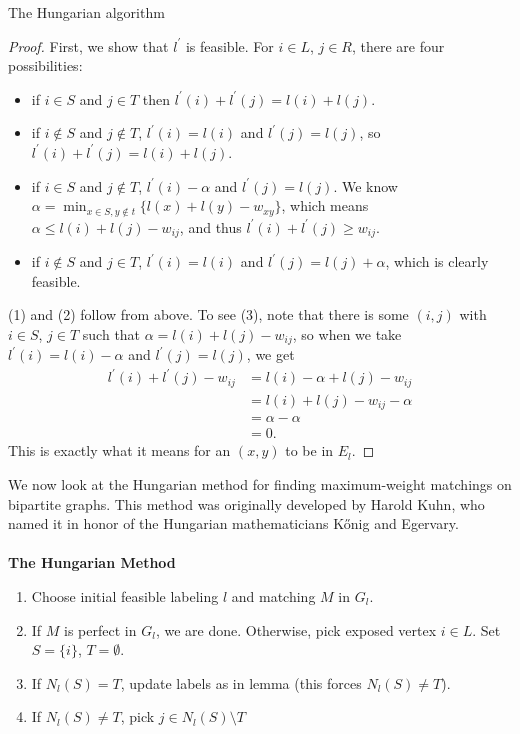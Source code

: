 \documentclass[11pt]{article}
\renewcommand{\'}{^{'}}
\begin{document}
\begin{section}{The Hungarian algorithm}
	\begin{proof}
		First, we show that $l\'$ is feasible. For $i\in L$, $j\in R$, there are four 
		possibilities:
		\begin{itemize}
			\item if $i\in S$ and $j\in T$ then $l\' (i) + l\' (j) = l(i) + l(j)$.
			\item if $i\notin S$ and $j\notin T$, $l\' (i) = l(i)$ and $l\' (j) = l(j)$, 
				so $l\' (i) + l\' (j) = l(i) + l(j)$.
			\item if $i\in S$ and $j\notin T$, $l\' (i) - \alpha$ and $l\' (j) = l(j)$. 
				We know $\alpha = \min_{x\in S,y\notin t} \{l(x) + l(y) - w_{xy}\}$, 
				which means $\alpha \leq l(i) + l(j) - w_{ij}$, and thus 
				$l\' (i) + l\' (j) \geq w_{ij}$.
			\item if $i\notin S$ and $j\in T$, $l\' (i) = l(i)$ and $l\' (j) = l(j) + 
				\alpha$, which is clearly feasible.
		\end{itemize}
		(1) and (2) follow from above. To see (3), note that there is some $(i,j)$ with 
		$i\in S$, $j\in T$ such that $\alpha = l(i) + l(j) - w_{ij}$, so when we take 
		$l\' (i) = l(i) - \alpha$ and $l\' (j) = l(j)$, we get 
		\begin{align*}
			l\' (i) + l\' (j) - w_{ij} &= l(i) - \alpha + l(j) - w_{ij} \\
						   &= l(i) + l(j) - w_{ij} - \alpha \\
						   &= \alpha - \alpha \\
						   &= 0.
		\end{align*}
		This is exactly what it means for an $(x,y)$ to be in $E_l$.
	\end{proof}
	We now look at the Hungarian method for finding maximum-weight matchings on bipartite graphs. 
	This method was originally developed by Harold Kuhn, who named it in honor of the Hungarian 
	mathematicians K\H{o}nig and Egervary.\\
	\\
	\textbf{The Hungarian Method}
	\begin{enumerate}
		\item Choose initial feasible labeling $l$ and matching $M$ in $G_l$.
		\item If $M$ is perfect in $G_l$, we are done. Otherwise, pick exposed 
			vertex $i\in L$. Set $S = \{i\}$, $T=\emptyset$.
		\item If $N_l (S) = T$, update labels as in lemma (this forces $N_l (S)\neq T$).
		\item If $N_l (S) \neq T$, pick $j\in N_l (S)\setminus T$

\end{enumerate}
\end{section}
\end{document}
